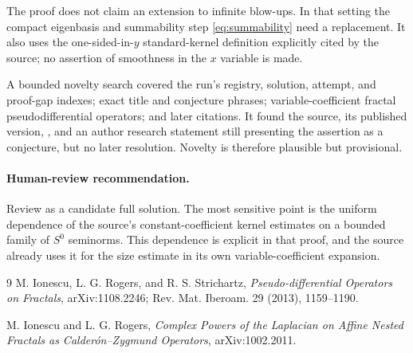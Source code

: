 \documentclass[11pt]{article}
\begin{document}
The proof does not claim an extension to infinite blow-ups. In that setting
the compact eigenbasis and summability step \eqref{eq:summability} need a
replacement. It also uses the one-sided-in-$y$ standard-kernel definition
explicitly cited by the source; no assertion of smoothness in the $x$ variable
is made.

A bounded novelty search covered the run's registry, solution, attempt, and
proof-gap indexes; exact title and conjecture phrases; variable-coefficient
fractal pseudodifferential operators; and later citations. It found the source,
its published version, \cite{IR}, and an author research statement still
presenting the assertion as a conjecture, but no later resolution. Novelty is
therefore plausible but provisional.

\paragraph{Human-review recommendation.}
Review as a candidate full solution. The most sensitive point is the uniform
dependence of the source's constant-coefficient kernel estimates on a bounded
family of $S^0$ seminorms. This dependence is explicit in that proof, and the
source already uses it for the size estimate in its own variable-coefficient
expansion.

\begin{thebibliography}{9}
M. Ionescu, L. G. Rogers, and R. S. Strichartz,
\emph{Pseudo-differential Operators on Fractals},
arXiv:1108.2246; Rev. Mat. Iberoam. 29 (2013), 1159--1190.

M. Ionescu and L. G. Rogers,
\emph{Complex Powers of the Laplacian on Affine Nested Fractals as
Calder\'on--Zygmund Operators},
arXiv:1002.2011.
\end{thebibliography}
\end{document}
